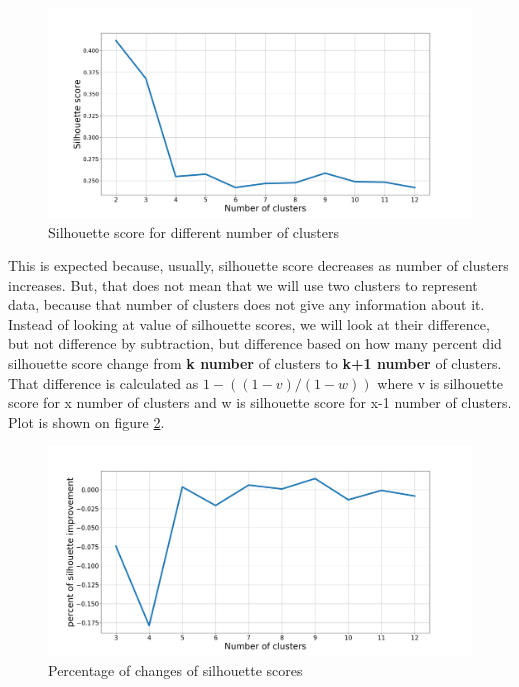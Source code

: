 \documentclass[a4paper]{article}
\begin{document}
\begin{figure}[h!]
\begin{center}
\includegraphics[scale=0.28]{num_of_clusters_shooting.png}
\end{center}
\caption{Silhouette score for different number of clusters}
\label{plt:num_cls_shooting}
\end{figure}

This is expected because, usually, silhouette score decreases as number of clusters increases. But, that does not mean that we will use two clusters to represent data, because that number of clusters does not give any information about it. Instead of looking at value of silhouette scores, we will look at their difference, but not difference by subtraction, but difference based on how many percent did silhouette score change from \textbf{k number} of clusters to \textbf{k+1 number} of clusters. That difference is calculated as $ 1 - ((1 - v) / (1 - w)) $ where v is silhouette score for x number of clusters and w is silhouette score for x-1 number of clusters. Plot is shown on figure \ref{plt:num_cls_pct_change}.

\begin{figure}[h!]
\begin{center}
\includegraphics[scale=0.28]{num_of_clusters_shooting_pct_change.png}
\end{center}
\caption{Percentage of changes of silhouette scores}
\label{plt:num_cls_pct_change}
\end{figure}
\end{document}
